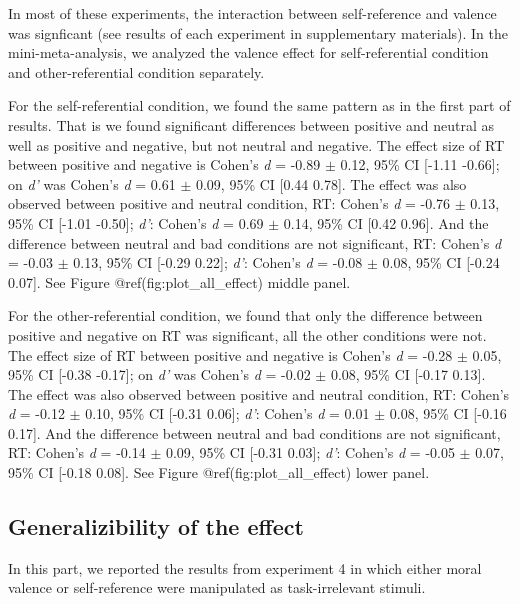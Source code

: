 \documentclass[
  man]{apa6}
\begin{document}
In most of these experiments, the interaction between self-reference and valence was signficant (see results of each experiment in supplementary materials). In the mini-meta-analysis, we analyzed the valence effect for self-referential condition and other-referential condition separately.

For the self-referential condition, we found the same pattern as in the first part of results. That is we found significant differences between positive and neutral as well as positive and negative, but not neutral and negative. The effect size of RT between positive and negative is Cohen's \emph{d} = -0.89 \(\pm\) 0.12, 95\% CI {[}-1.11 -0.66{]}; on \emph{d'} was Cohen's \emph{d} = 0.61 \(\pm\) 0.09, 95\% CI {[}0.44 0.78{]}. The effect was also observed between positive and neutral condition, RT: Cohen's \emph{d} = -0.76 \(\pm\) 0.13, 95\% CI {[}-1.01 -0.50{]}; \emph{d'}: Cohen's \emph{d} = 0.69 \(\pm\) 0.14, 95\% CI {[}0.42 0.96{]}. And the difference between neutral and bad conditions are not significant, RT: Cohen's \emph{d} = -0.03 \(\pm\) 0.13, 95\% CI {[}-0.29 0.22{]}; \emph{d'}: Cohen's \emph{d} = -0.08 \(\pm\) 0.08, 95\% CI {[}-0.24 0.07{]}. See Figure @ref(fig:plot\_all\_effect) middle panel.

For the other-referential condition, we found that only the difference between positive and negative on RT was significant, all the other conditions were not. The effect size of RT between positive and negative is Cohen's \emph{d} = -0.28 \(\pm\) 0.05, 95\% CI {[}-0.38 -0.17{]}; on \emph{d'} was Cohen's \emph{d} = -0.02 \(\pm\) 0.08, 95\% CI {[}-0.17 0.13{]}. The effect was also observed between positive and neutral condition, RT: Cohen's \emph{d} = -0.12 \(\pm\) 0.10, 95\% CI {[}-0.31 0.06{]}; \emph{d'}: Cohen's \emph{d} = 0.01 \(\pm\) 0.08, 95\% CI {[}-0.16 0.17{]}. And the difference between neutral and bad conditions are not significant, RT: Cohen's \emph{d} = -0.14 \(\pm\) 0.09, 95\% CI {[}-0.31 0.03{]}; \emph{d'}: Cohen's \emph{d} = -0.05 \(\pm\) 0.07, 95\% CI {[}-0.18 0.08{]}. See Figure @ref(fig:plot\_all\_effect) lower panel.

\hypertarget{generalizibility-of-the-effect}{%
\subsection{Generalizibility of the effect}\label{generalizibility-of-the-effect}}

In this part, we reported the results from experiment 4 in which either moral valence or self-reference were manipulated as task-irrelevant stimuli.
\end{document}
